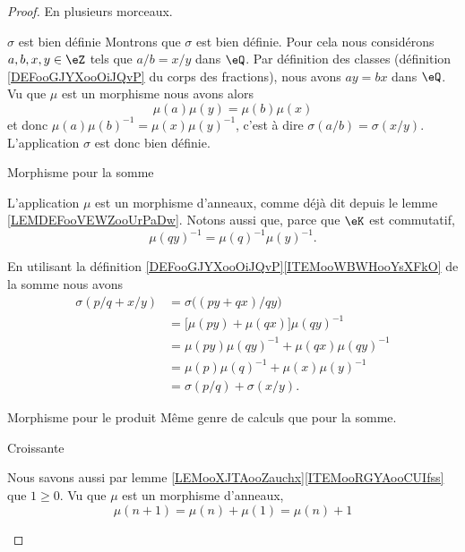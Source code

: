 \begin{proof}
    En plusieurs morceaux.
    \begin{subproof}
    \item[\( \sigma\) est bien définie]
    Montrons que \( \sigma\) est bien définie. Pour cela nous considérons \( a,b,x,y\in \eZ\) tels que \( a/b=x/y\) dans \( \eQ\). Par définition des classes (définition \ref{DEFooGJYXooOiJQvP} du corps des fractions), nous avons \( ay=bx\) dans \( \eQ\). Vu que \( \mu\) est un morphisme nous avons alors
    \begin{equation}
        \mu(a)\mu(y)=\mu(b)\mu(x)
    \end{equation}
    et donc \( \mu(a)\mu(b)^{-1}=\mu(x)\mu(y)^{-1}\), c'est à dire \( \sigma(a/b)=\sigma(x/y)\). L'application \( \sigma\) est donc bien définie.

\item[Morphisme pour la somme]

    L'application \( \mu\) est un morphisme d'anneaux, comme déjà dit depuis le lemme \ref{LEMDEFooVEWZooUrPaDw}. Notons aussi que, parce que \( \eK\) est commutatif,
    \begin{equation}
        \mu(qy)^{-1}=\mu(q)^{-1}\mu(y)^{-1}.
    \end{equation}

    En utilisant la définition \ref{DEFooGJYXooOiJQvP}\ref{ITEMooWBWHooYsXFkO} de la somme nous avons
    \begin{subequations}
        \begin{align}
            \sigma(p/q+x/y)&=\sigma\big( (py+qx)/qy \big)\\
            &=\big[ \mu(py)+\mu(qx) \big]\mu(qy)^{-1}\\
            &=\mu(py)\mu(qy)^{-1}+\mu(qx)\mu(qy)^{-1}\\
            &=\mu(p)\mu(q)^{-1}+\mu(x)\mu(y)^{-1}\\
            &=\sigma(p/q)+\sigma(x/y).
        \end{align}
    \end{subequations}

\item[Morphisme pour le produit]
    Même genre de calculs que pour la somme.
\item[Croissante]

    Nous savons aussi par lemme \ref{LEMooXJTAooZauchx}\ref{ITEMooRGYAooCUIfss} que \( 1\geq 0\). Vu que \( \mu\) est un morphisme d'anneaux,
    \begin{equation}
        \mu(n+1)=\mu(n)+\mu(1)=\mu(n)+1
    \end{equation}


\end{subproof}
\end{proof}
